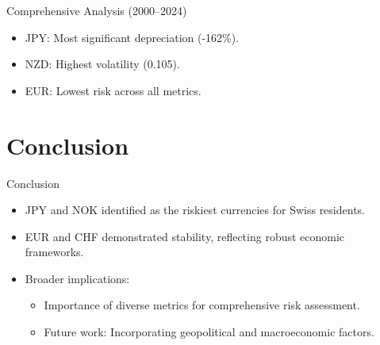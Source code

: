 \documentclass{beamer}
\begin{document}
\begin{frame}{Comprehensive Analysis (2000--2024)}
  \begin{itemize}
    \item JPY: Most significant depreciation (-162\%).
    \item NZD: Highest volatility (0.105).
    \item EUR: Lowest risk across all metrics.
  \end{itemize}
\end{frame}

\section{Conclusion}
\begin{frame}{Conclusion}
  \begin{itemize}
    \item JPY and NOK identified as the riskiest currencies for Swiss residents.
    \item EUR and CHF demonstrated stability, reflecting robust economic frameworks.
    \item Broader implications:
    \begin{itemize}
      \item Importance of diverse metrics for comprehensive risk assessment.
      \item Future work: Incorporating geopolitical and macroeconomic factors.
    \end{itemize}
  \end{itemize}
\end{frame}
\end{document}
